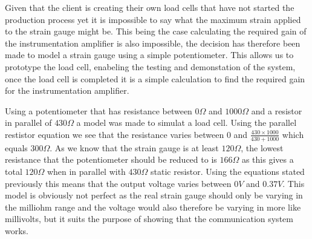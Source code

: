 Given that the client is creating their own load cells that have not started the production process yet it is impossible to say what the maximum strain applied to the strain gauge might be. This being the case calculating the required gain of the instrumentation amplifier is also impossible, the decision has therefore been made to model a strain gauge using a simple potentiometer. This allows us to prototype the load cell, enabeling the testing and demonstation of the system, once the load cell is completed it is a simple calculation to find the required gain for the instrumentation amplifier. 

Using a potentiometer that has resistance between $0\Omega$ and $1000\Omega$ and a resistor in parallel of $430\Omega$ a model was made to simulat a load cell. Using the parallel restistor equation we see that the resistance varies between $0$ and $\frac{430 \times 1000}{430 + 1000}$  which equals $300\Omega$. As we know that the strain gauge is at least $120\Omega$, the lowest resistance that the potentiometer should be reduced to is $166\Omega$ as this gives a total $120\Omega$ when in parallel with $430\Omega$ static resistor. Using the equations stated previously this means that the output voltage varies between $0V$ and $0.37V$. This model is obviously not perfect as the real strain gauge should only be varying in the milliohm range and the voltage would also therefore be varying in more like millivolts, but it suits the purpose of showing that the communication system works. 
